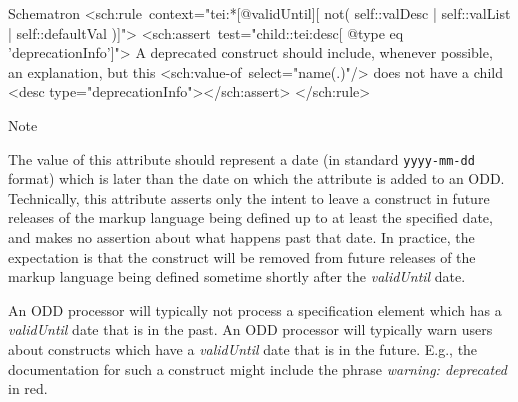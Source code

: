 \begin{reflist}
\begin{sansreflist}
\begin{reflist}
    \item[{Schematron}]
   <sch:rule context="tei:*[@validUntil][ not( self::valDesc | self::valList | self::defaultVal   )]"> <sch:assert test="child::tei:desc[ @type eq 'deprecationInfo']"> A deprecated construct should include, whenever possible, an explanation, but this <sch:value-of select="name(.)"/> does not have a child <desc type="deprecationInfo"></sch:assert> </sch:rule>
    \item[{Note}]
  \par
The value of this attribute should represent a date (in standard \texttt{yyyy-mm-dd} format) which is later than the date on which the attribute is added to an ODD. Technically, this attribute asserts only the intent to leave a construct in future releases of the markup language being defined up to at least the specified date, and makes no assertion about what happens past that date. In practice, the expectation is that the construct will be removed from future releases of the markup language being defined sometime shortly after the {\itshape validUntil} date.\par
An ODD processor will typically not process a specification element which has a {\itshape validUntil} date that is in the past. An ODD processor will typically warn users about constructs which have a {\itshape validUntil} date that is in the future. E.g., the documentation for such a construct might include the phrase \textit{warning: deprecated} in red.
\end{reflist}  
\end{sansreflist}  
\end{reflist}  
